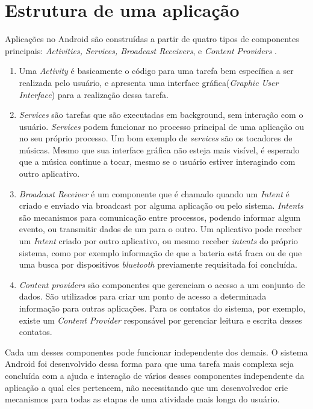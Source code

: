 \section{Estrutura de uma aplicação}

Aplicações no Android são construídas a partir de quatro tipos de componentes principais: \textit{Activities, Services, Broadcast Receivers}, e \textit{Content Providers} \cite{heuser2014}. 

\begin{enumerate}
\item Uma \textit{Activity} é basicamente o código para uma tarefa bem específica a ser realizada pelo usuário, e apresenta uma interface gráfica(\textit{Graphic User Interface}) para a realização dessa tarefa.

\item \textit{Services} são tarefas que são executadas em background, sem interação com o usuário. \textit{Services} podem funcionar no processo principal de uma aplicação ou no seu próprio processo. Um bom exemplo de \textit{services} são os tocadores de músicas. Mesmo que sua interface gráfica não esteja mais visível, é esperado que a música continue a tocar, mesmo se o usuário estiver interagindo com outro aplicativo. 

\item \textit{Broadcast Receiver} é um componente que é chamado quando um \textit{Intent} é criado e enviado via broadcast por alguma aplicação ou pelo sistema. \textit{Intents} são mecanismos para comunicação entre processos, podendo informar algum evento, ou transmitir dados de um para o outro.
Um aplicativo pode receber um \textit{Intent} criado por outro aplicativo, ou mesmo receber \textit{intents} do próprio sistema, como por exemplo informação de que a bateria está fraca ou de que uma busca por dispositivos \textit{bluetooth} previamente requisitada foi concluída. 

\item \textit{Content providers} são componentes que gerenciam o acesso a um conjunto de dados. São utilizados para criar um ponto de acesso a determinada informação para outras aplicações. Para os contatos do sistema, por exemplo, existe um \textit{Content Provider} responsável por gerenciar leitura e escrita desses contatos. 
\end{enumerate}


Cada um desses componentes pode funcionar independente dos demais. O sistema Android foi desenvolvido dessa forma para que uma tarefa mais complexa seja concluída com a ajuda e interação de vários desses componentes independente da aplicação a qual eles pertencem, não necessitando que um desenvolvedor crie mecanismos para todas as etapas de uma atividade mais longa do usuário.  

